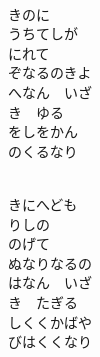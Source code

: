 \documentclass[10pt,b5j]{tarticle} %
\begin{document}
\vspace{1.5em} %
\newcommand{\linespace}{0.5em} %
\newcommand{\blocksize}{0.5\hsize} %
\newcommand{\itemmargin}{6em} %
\begin{enumerate} %
    \setlength{\itemindent}{\itemmargin} %
    \begin{minipage}[c]{\blocksize}
    
        \vspace{\linespace}
        \item~\\
        きのに\\
        うちてしが\\
        にれて\\
        ぞなるのきよ\\
        へなん　いざ\\
        き　ゆる\\
        をしをかん\\
        のくるなり
        
        \vspace{\linespace}
        \item~\\
        きにへども\\
        りしの\\
        のげて\\
        ぬなりなるの\\
        はなん　いざ\\
        き　たぎる\\
        しくくかばや\\
        びはくくなり
        

\end{minipage}
\end{enumerate}
\end{document}
